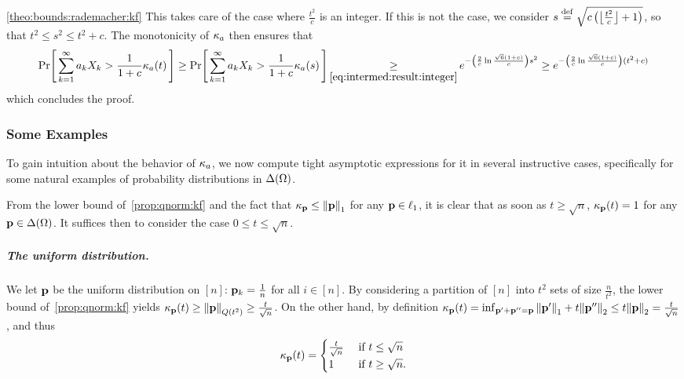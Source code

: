 \begin{proofof}{\cref{theo:bounds:rademacher:kf}}
This takes care of the case where $\frac{t^2}{c}$ is an integer. If this is not the case, we consider
$s \eqdef \sqrt{c\left(\flr{\frac{t^2}{c}}+1\right)}$, so that $t^2 \leq s^2 \leq t^2+c$. The monotonicity of $\kf{a}$ then ensures that
\[
\probaOf{ \sum_{k=1}^\infty a_k X_k > \frac{1}{1+c} \kf{a}(t) } 
\geq \probaOf{ \sum_{k=1}^\infty a_k X_k > \frac{1}{1+c} \kf{a}(s) } 
\operatorname*{\geq}_{\eqref{eq:intermed:result:integer}} e^{-\left( \frac{2}{c}\ln\frac{\sqrt{6}(1+c)}{c}\right) s^2 }
\geq e^{-\left( \frac{2}{c}\ln\frac{\sqrt{6}(1+c)}{c}\right) (t^2+c) }
\]
which concludes the proof.
\end{proofof}

\subsubsection{Some Examples}

To gain intuition about the behavior of $\kf{a}$, we now compute tight asymptotic expressions for it in several instructive cases, specifically for some natural examples of probability distributions in $\distribs{\domain}$.

From the lower bound of~\cref{prop:qnorm:kf} and the fact that $\kf{\p} \leq \normone{\p}$ for any $\p\in\lp[1]$, it is clear that as soon as $t\geq \sqrt{n}$,
$
    \kf{\p}(t) = 1
$
for any $\p\in\distribs{\domain}$. It suffices then to consider the case $0\leq t\leq \sqrt{n}$.

\subparagraph{The uniform distribution.} We let $\p$ be the uniform distribution on $[n]$: $\p_k = \frac{1}{n}$ for all $i\in[n]$. By considering a partition of $[n]$ into $t^2$ sets of size $\frac{n}{t^2}$, the lower bound of~\cref{prop:qnorm:kf} yields
$
\kf{\p}(t) \geq \norm{\p}_{Q(t^2)} \geq \frac{t}{\sqrt{n}}
$. On the other hand, by definition $\kf{\p}(t) = \inf_{\p'+\p''=\p} \normone{\p'}+t\normtwo{\p''} \leq t\normtwo{\p} = \frac{t}{\sqrt{n}}$, and thus
\[
    \kf{\p}(t) = \begin{cases}
    \frac{t}{\sqrt{n}} & \text{ if } t\leq \sqrt{n}\\
    1 & \text{ if } t\geq \sqrt{n}.
    \end{cases}
\]

